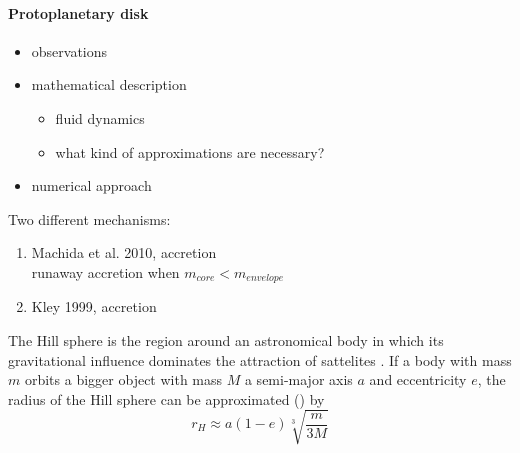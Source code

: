 

\paragraph{Protoplanetary disk}
  \begin{itemize}
    \item observations
    \item mathematical description
      \begin{itemize}
        \item fluid dynamics
        \item what kind of approximations are necessary?
      \end{itemize}
    \item numerical approach
  \end{itemize}



  Two different mechanisms:
  \begin{enumerate}
    \item Machida et al. 2010, accretion \\
    runaway accretion when $m_{core}<m_{envelope}$
    \item Kley 1999, accretion
  \end{enumerate} 


  The Hill sphere is the region around an astronomical body in which its
  gravitational influence dominates the attraction of sattelites
  \cite{def hill radius}. If a body with mass $m$ orbits a bigger object 
  with mass $M$  a semi-major axis $a$ and eccentricity $e$, the 
  radius of the Hill sphere can be approximated
  () by
  \begin{equation}
    r_H\approx a(1-e)\sqrt[3]{\frac{m}{3M}}
    \label{eq: def hill radius}
  \end{equation}

